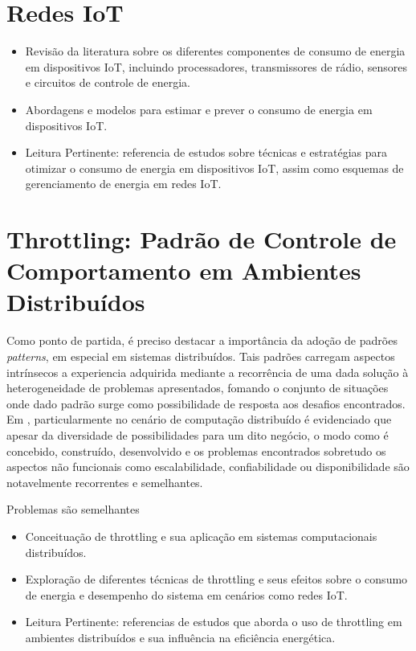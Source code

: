 \section{Redes IoT}
\label{cap2:iot}
\begin{itemize}
	\item Revisão da literatura sobre os diferentes componentes de consumo de energia em dispositivos IoT, incluindo processadores, transmissores de rádio, sensores e circuitos de controle de energia.
	\item Abordagens e modelos para estimar e prever o consumo de energia em dispositivos IoT.
	\item Leitura Pertinente: referencia de estudos sobre técnicas e estratégias para otimizar o consumo de energia em dispositivos IoT, assim como esquemas de gerenciamento de energia em redes IoT.
\end{itemize}

\section{Throttling: Padrão de Controle de Comportamento em Ambientes Distribuídos}
\label{cap2:throttling}

Como ponto de partida, é preciso destacar a importância da adoção de padrões \textit{patterns}, em especial em sistemas distribuídos. Tais padrões carregam aspectos intrínsecos a experiencia adquirida mediante a recorrência de uma dada solução à heterogeneidade de problemas apresentados, fomando o conjunto de situações onde dado padrão surge como possibilidade de resposta aos desafios encontrados. Em \cite{burns_designing_nodate}, particularmente no cenário de computação distribuído é evidenciado que apesar da diversidade de possibilidades para um dito negócio, o modo como é concebido, construído, desenvolvido e os problemas encontrados sobretudo os  aspectos não funcionais como escalabilidade, confiabilidade ou disponibilidade são notavelmente recorrentes e semelhantes. 

Problemas são semelhantes


\begin{itemize}
	\item Conceituação de throttling e sua aplicação em sistemas computacionais distribuídos.
	\item Exploração de diferentes técnicas de throttling e seus efeitos sobre o consumo de energia e desempenho do sistema em cenários como redes IoT.
	\item Leitura Pertinente: referencias de estudos que aborda o uso de throttling em ambientes distribuídos e sua influência na eficiência energética.
\end{itemize}

